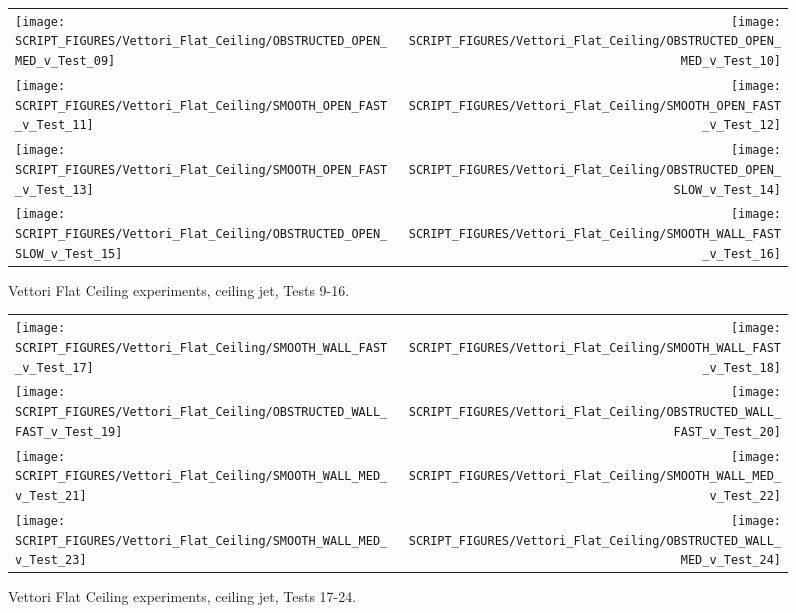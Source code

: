 \begin{figure}[p]
\begin{tabular*}{\textwidth}{l@{\extracolsep{\fill}}r}
\texttt{[image: SCRIPT\_FIGURES/Vettori\_Flat\_Ceiling/OBSTRUCTED\_OPEN\_MED\_v\_Test\_09]} &
\texttt{[image: SCRIPT\_FIGURES/Vettori\_Flat\_Ceiling/OBSTRUCTED\_OPEN\_MED\_v\_Test\_10]} \\
\texttt{[image: SCRIPT\_FIGURES/Vettori\_Flat\_Ceiling/SMOOTH\_OPEN\_FAST\_v\_Test\_11]} &
\texttt{[image: SCRIPT\_FIGURES/Vettori\_Flat\_Ceiling/SMOOTH\_OPEN\_FAST\_v\_Test\_12]} \\
\texttt{[image: SCRIPT\_FIGURES/Vettori\_Flat\_Ceiling/SMOOTH\_OPEN\_FAST\_v\_Test\_13]} &
\texttt{[image: SCRIPT\_FIGURES/Vettori\_Flat\_Ceiling/OBSTRUCTED\_OPEN\_SLOW\_v\_Test\_14]} \\
\texttt{[image: SCRIPT\_FIGURES/Vettori\_Flat\_Ceiling/OBSTRUCTED\_OPEN\_SLOW\_v\_Test\_15]} &
\texttt{[image: SCRIPT\_FIGURES/Vettori\_Flat\_Ceiling/SMOOTH\_WALL\_FAST\_v\_Test\_16]} \\
\end{tabular*}
\caption{Vettori Flat Ceiling experiments, ceiling jet, Tests 9-16.}
\label{Vettori_2}
\end{figure}

\begin{figure}[p]
\begin{tabular*}{\textwidth}{l@{\extracolsep{\fill}}r}
\texttt{[image: SCRIPT\_FIGURES/Vettori\_Flat\_Ceiling/SMOOTH\_WALL\_FAST\_v\_Test\_17]} &
\texttt{[image: SCRIPT\_FIGURES/Vettori\_Flat\_Ceiling/SMOOTH\_WALL\_FAST\_v\_Test\_18]} \\
\texttt{[image: SCRIPT\_FIGURES/Vettori\_Flat\_Ceiling/OBSTRUCTED\_WALL\_FAST\_v\_Test\_19]} &
\texttt{[image: SCRIPT\_FIGURES/Vettori\_Flat\_Ceiling/OBSTRUCTED\_WALL\_FAST\_v\_Test\_20]} \\
\texttt{[image: SCRIPT\_FIGURES/Vettori\_Flat\_Ceiling/SMOOTH\_WALL\_MED\_v\_Test\_21]} &
\texttt{[image: SCRIPT\_FIGURES/Vettori\_Flat\_Ceiling/SMOOTH\_WALL\_MED\_v\_Test\_22]} \\
\texttt{[image: SCRIPT\_FIGURES/Vettori\_Flat\_Ceiling/SMOOTH\_WALL\_MED\_v\_Test\_23]} &
\texttt{[image: SCRIPT\_FIGURES/Vettori\_Flat\_Ceiling/OBSTRUCTED\_WALL\_MED\_v\_Test\_24]} \\
\end{tabular*}
\caption{Vettori Flat Ceiling experiments, ceiling jet, Tests 17-24.}
\label{Vettori_3}
\end{figure}


